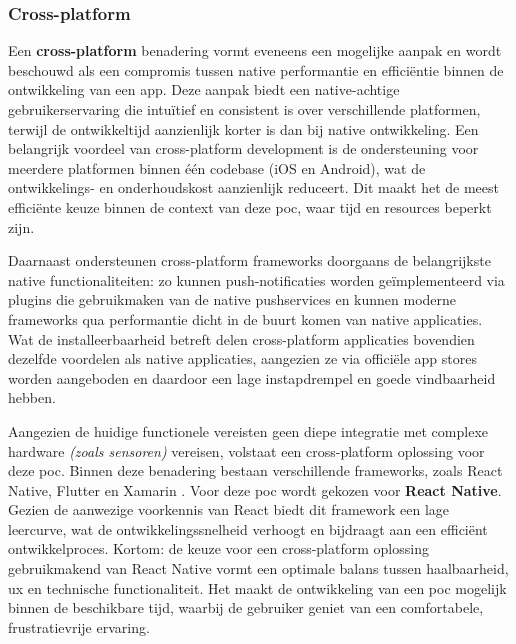 \subsubsection{Cross-platform}
\label{subsubsec:cross-platform}

\vspace{1em}

Een \textbf{cross-platform} benadering vormt eveneens een mogelijke aanpak en wordt beschouwd als een compromis tussen native performantie en efficiëntie binnen de ontwikkeling van een app. Deze aanpak biedt een native-achtige gebruikerservaring \autocite{Gerges2024} die intuïtief en consistent is over verschillende platformen, terwijl de ontwikkeltijd aanzienlijk korter is dan bij native ontwikkeling. Een belangrijk voordeel van cross-platform development is de ondersteuning voor meerdere platformen binnen één codebase (iOS en Android), wat de ontwikkelings- en onderhoudskost aanzienlijk reduceert. Dit maakt het de meest efficiënte keuze binnen de context van deze \acrshort{poc}, waar tijd en resources beperkt zijn.

\vspace{1em}

Daarnaast ondersteunen cross-platform frameworks doorgaans de belangrijkste native functionaliteiten: zo kunnen push-notificaties worden geïmplementeerd via plugins die gebruikmaken van de native pushservices en kunnen moderne frameworks qua performantie dicht in de buurt komen van native applicaties. Wat de installeerbaarheid betreft delen cross-platform applicaties bovendien dezelfde voordelen als native applicaties, aangezien ze via officiële app stores worden aangeboden en daardoor een lage instapdrempel en goede vindbaarheid hebben.

\vspace{1em}

Aangezien de huidige functionele vereisten geen diepe integratie met complexe hardware \textit{(zoals sensoren)} vereisen, volstaat een cross-platform oplossing voor deze \acrshort{poc}. Binnen deze benadering bestaan verschillende frameworks, zoals React Native, Flutter en Xamarin \autocite{Souha2024}. Voor deze \acrshort{poc} wordt gekozen voor \textbf{React Native}. Gezien de aanwezige voorkennis van React biedt dit framework een lage leercurve, wat de ontwikkelingssnelheid verhoogt en bijdraagt aan een efficiënt ontwikkelproces. Kortom: de keuze voor een cross-platform oplossing gebruikmakend van React Native vormt een optimale balans tussen haalbaarheid, \acrshort{ux} en technische functionaliteit. Het maakt de ontwikkeling van een \acrshort{poc} mogelijk binnen de beschikbare tijd, waarbij de gebruiker geniet van een comfortabele, frustratievrije ervaring.

